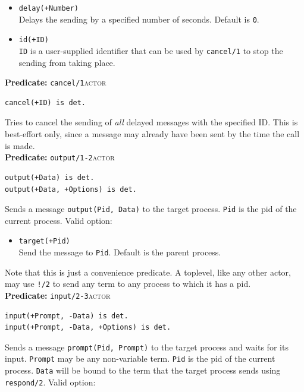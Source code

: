 \begin{itemize}
\item
  \texttt{delay(+Number)}\\
  Delays the sending by a specified number of seconds. Default is \texttt{0}.
\item
  \texttt{id(+ID)}\\
  \texttt{ID} is a user-supplied identifier that can be used by
  \texttt{cancel/1} to stop the sending from taking place.
\end{itemize}

\noindent \textbf{Predicate:} \texttt{cancel/1}\hfill\textsc{actor}

\begin{verbatim}
cancel(+ID) is det.
\end{verbatim}

\noindent Tries to cancel the sending of \textit{all} delayed messages with the
specified ID. This is best-effort only, since a message may already have been
sent by the time the call is made.\\

\noindent \textbf{Predicate:} \texttt{output/1-2}\hfill\textsc{actor}

\begin{verbatim}
output(+Data) is det.
output(+Data, +Options) is det.
\end{verbatim}

\noindent Sends a message \texttt{output(Pid,\,Data)} to the target process.
\texttt{Pid} is the pid of the current process. Valid option:

\begin{itemize}
\item
  \texttt{target(+Pid)}\\
  Send the message to \texttt{Pid}. Default is the parent process.
\end{itemize}

\noindent Note that this is just a convenience predicate. A toplevel, like any
other actor, may use \texttt{!/2} to send any term to any process to which it
has a pid.\\

\noindent \textbf{Predicate:} \texttt{input/2-3}\hfill\textsc{actor}

\begin{verbatim}
input(+Prompt, -Data) is det.
input(+Prompt, -Data, +Options) is det.
\end{verbatim}

\noindent Sends a message \texttt{prompt(Pid,\,Prompt)} to the target process and
waits for its input. \texttt{Prompt} may be any non-variable term.
\texttt{Pid} is the pid of the current process. \texttt{Data} will be bound to
the term that the target process sends using \texttt{respond/2}. Valid option:

